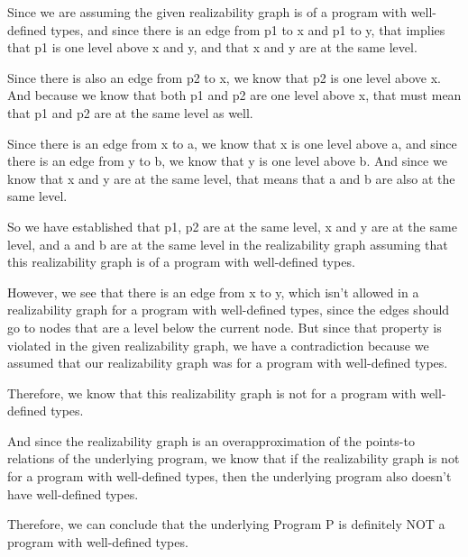 \documentclass[12pt]{article}
\begin{document}
\begin{enumerate}
\begin{mdframed}
        Since we are assuming the given realizability graph is of a program with well-defined types, and since there is an edge from p1 to x and p1 to y, that implies that p1 is one level above x and y, and that x and y are at the same level.

        Since there is also an edge from p2 to x, we know that p2 is one level above x. And because we know that both p1 and p2 are one level above x, that must mean that p1 and p2 are at the same level as well.

        Since there is an edge from x to a, we know that x is one level above a, and since there is an edge from y to b, we know that y is one level above b. And since we know that x and y are at the same level, that means that a and b are also at the same level.

        So we have established that p1, p2 are at the same level, x and y are at the same level, and a and b are at the same level in the realizability graph assuming that this realizability graph is of a program with well-defined types.

        However, we see that there is an edge from x to y, which isn't allowed in a realizability graph for a program with well-defined types, since the edges should go to nodes that are a level below the current node. But since that property is violated in the given realizability graph, we have a contradiction because we assumed that our realizability graph was for a program with well-defined types.

        Therefore, we know that this realizability graph is not for a program with well-defined types.

        And since the realizability graph is an overapproximation of the points-to relations of the underlying program, we know that if the realizability graph is not for a program with well-defined types, then the underlying program also doesn't have well-defined types.

        Therefore, we can conclude that the underlying Program P is definitely NOT a program with well-defined types.

       \end{mdframed}
    

    \end{enumerate}
    
\end{document}
